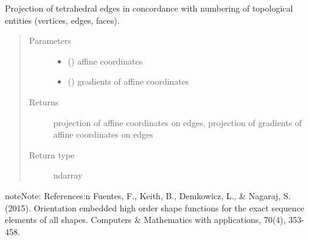 \documentclass[letterpaper,10pt,english]{sphinxmanual}
\begin{document}
\begin{fulllineitems}
\label{\detokenize{petgem/hvfem:petgem.hvfem.ProjectTetE}}
Projection of tetrahedral edges in concordance with numbering of topological entities (vertices, edges, faces).
\begin{quote}\begin{description}
\item[{Parameters}] \leavevmode\begin{itemize}
\item {} 
 () \textendash{} affine coordinates

\item {} 
 () \textendash{} gradients of affine coordinates

\end{itemize}

\item[{Returns}] \leavevmode
projection of affine coordinates on edges, projection of gradients of affine coordinates on edges

\item[{Return type}] \leavevmode
ndarray

\end{description}\end{quote}

\begin{sphinxadmonition}{note}{Note:}
References:n
Fuentes, F., Keith, B., Demkowicz, L., \& Nagaraj, S. (2015). Orientation
embedded high order shape functions for the exact sequence elements of
all shapes. Computers \& Mathematics with applications, 70(4), 353-458.
\end{sphinxadmonition}

\end{fulllineitems}

\end{document}
